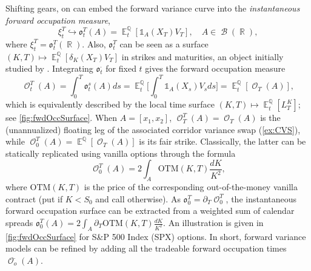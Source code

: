 \documentclass[11pt]{article}
\def\mo{\mathfrak{o}}
\theoremstyle{plain}
\theoremstyle{definition}
\DeclareMathOperator{\E}{\mathbb{E}}
\DeclareMathOperator{\Q}{\mathbb{Q}}
\DeclareMathOperator{\R}{\mathbb{R}}
\DeclareMathOperator{\calB}{\mathcal{B}}
\DeclareMathOperator{\calO}{\mathcal{O}}
\begin{document}
Shifting gears, on can embed the forward variance curve into the \textit{instantaneous forward occupation measure},  
\begin{equation}\label{eq:instFwdOcc}
\xi_t^{T} \hookrightarrow   \mo_t^T(A) = \E^{\Q}_t[\mathds{1}_{A}(X_T)V_T],  \quad A\in \calB(\R), 
\end{equation}
where $\xi_t^T = \mo_t^T(\R)$. %
Also, $\mo_t^T$ can be seen as a surface $(K,T) \mapsto  \E^{\Q}_t[\delta_{K}(X_T)V_T]$ in strikes and maturities, an object initially studied by \citet{dupire2004unified}.  
Integrating  $\mo_t^{\cdot}$ for fixed $t$   gives the   forward occupation measure
\begin{equation}
    \calO_t^T(A) = \int_0^T \mo_t^{s}(A) ds = \E^{\Q}_t\Big[\int_0^T \mathds{1}_{A}(X_s)V_sds\Big] %
    = \E^{\Q}_t[\calO_T(A)], %
\end{equation}
which is equivalently described by the local time surface $(K,T) \mapsto \E^{\Q}_t[L_T^K]$; see \cref{fig:fwdOccSurface}. 
When $A = [x_1,x_2]$,  $\calO_T^T(A) = \calO_T(A)$ is  the (unannualized) floating leg of the associated corridor variance swap (\cref{ex:CVS}), while $\calO_0^T(A) = \E^{\Q}[\calO_T(A)]$ is its fair strike. 
Classically, the latter can be statically replicated using vanilla options through the formula
$$\calO_0^T(A) = 2\int_A \text{OTM}(K,T) \frac{dK}{K^2}, $$
where $\text{OTM}(K,T)$ is the  price  of the corresponding out-of-the-money  vanilla contract (put  if $K< S_0$ and call otherwise). As $\mo_0^T = \partial_T \calO_0^T$, the instantaneous forward occupation surface can be extracted from a weighted sum of calendar spreads 
$\mo_0^T(A) = 2\int_A \partial_T\text{OTM}(K,T) \frac{dK}{K^2}. $ An illustration is given in  \cref{fig:fwdOccSurface} for S\&P 500 Index (SPX)  options. In short,  forward variance models can be refined by adding all the tradeable forward occupation times $\calO_o^{\cdot}(A)$.
\end{document}
